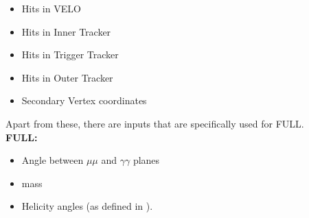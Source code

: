 \begin{itemize}
\item Hits in VELO 
\item Hits in Inner Tracker
\item Hits in Trigger Tracker
\item Hits in Outer Tracker
\item Secondary Vertex coordinates 
\end{itemize}

Apart from these, there are inputs that are specifically used for FULL. \\

\textbf{FULL:}

\begin{itemize} %
\item Angle between $\mu \mu$ and $\gamma\gamma$ planes
\item \Pgpz mass
\item Helicity angles (as defined in ). 
\end{itemize}


